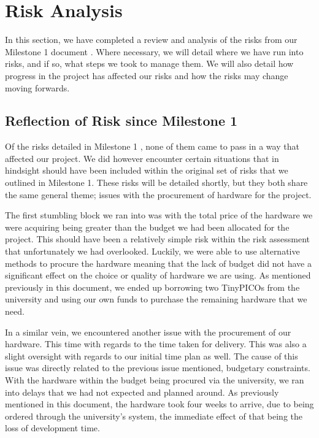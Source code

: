 \chapter{Risk Analysis} \label{sec:risk}

In this section, we have completed a review and analysis of the risks from our Milestone 1 document \cite{coaker}. Where necessary, we will detail where we have run into risks, and if so, what steps we took to manage them. We will also detail how progress in the project has affected our risks and how the risks may change moving forwards.

\section{Reflection of Risk since Milestone 1}
Of the risks detailed in Milestone 1 \cite{coaker}, none of them came to pass in a way that affected our project. We did however encounter certain situations that in hindsight should have been included within the original set of risks that we outlined in Milestone 1. These risks will be detailed shortly, but they both share the same general theme; issues with the procurement of hardware for the project. 

The first stumbling block we ran into was with the total price of the hardware we were acquiring being greater than the budget we had been allocated for the project. This should have been a relatively simple risk within the risk assessment that unfortunately we had overlooked. Luckily, we were able to use alternative methods to procure the hardware meaning that the lack of budget did not have a significant effect on the choice or quality of hardware we are using. As mentioned previously in this document, we ended up borrowing two TinyPICOs from the university and using our own funds to purchase the remaining hardware that we need. 

In a similar vein, we encountered another issue with the procurement of our hardware. This time with regards to the time taken for delivery. This was also a slight oversight with regards to our initial time plan as well. The cause of this issue was directly related to the previous issue mentioned, budgetary constraints. With the hardware within the budget being procured via the university, we ran into delays that we had not expected and planned around. As previously mentioned in this document, the hardware took four weeks to arrive, due to being ordered through the university's system, the immediate effect of that being the loss of development time. 

